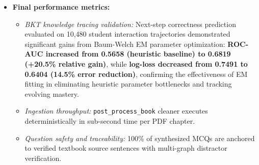 \begin{itemize}
    \item \textbf{Final performance metrics:}
    \begin{itemize}
        \item \textit{BKT knowledge tracing validation:} Next-step correctness prediction evaluated on 10,480 student interaction trajectories demonstrated significant gains from Baum-Welch EM parameter optimization: \textbf{ROC-AUC increased from 0.5658 (heuristic baseline) to 0.6819 (+20.5\% relative gain)}, while \textbf{log-loss decreased from 0.7491 to 0.6404 (14.5\% error reduction)}, confirming the effectiveness of EM fitting in eliminating heuristic parameter bottlenecks and tracking evolving mastery.
        \item \textit{Ingestion throughput:} \texttt{post\_process\_book} cleaner executes deterministically in sub-second time per PDF chapter.
        \item \textit{Question safety and traceability:} 100\% of synthesized MCQs are anchored to verified textbook source sentences with multi-graph distractor verification.
    \end{itemize}
\end{itemize}